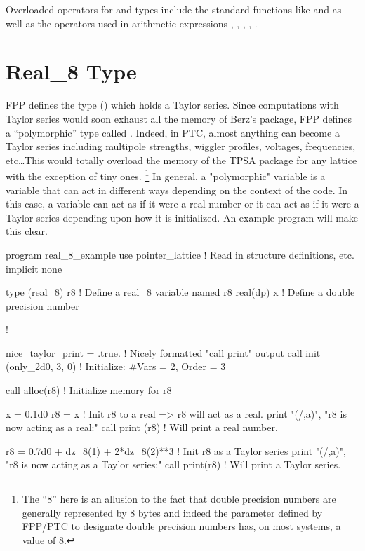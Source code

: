 \documentclass{hitec}     %
\newcommand{\Section}[1]{\section{#1}\vspace*{-1ex}}
\begin{document}
{{{{Overloaded operators for  and  types include the standard functions
like  and  as well as the operators used in arithmetic expressions \vn{+}, \vn{-},
\vn{*}, \vn{/}, \vn{**}.

\newpage

\Section{Real_8 Type}
\label{s:real.8}

FPP defines the  type () which holds a Taylor series. Since computations
with Taylor {\color{h} series would soon exhaust all the memory of Berz's package, FPP defines a ``polymorphic'' type called . Indeed, in PTC, almost anything can become a Taylor series including multipole strengths, wiggler profiles, voltages, frequencies, etc\ldots This would totally overload the memory of the TPSA package for any lattice with the exception of tiny ones.} \footnote
  {
The ``8'' here is an allusion to the fact that double precision numbers are generally represented
by 8 bytes and indeed the  parameter defined by FPP/PTC to designate double precision numbers
has, on most systems, a value of 8.
  }
In general, a "polymorphic" variable is a variable that can act in different ways depending on the
context of the code. In this case, a  variable can act as if it were a real number or it
can act as if it were a Taylor series depending upon how it is initialized. 
An example program will make this clear.
\begin{code}
program real_8_example
use pointer_lattice   ! Read in structure definitions, etc.
implicit none

type (real_8) r8      ! Define a real_8 variable named r8
real(dp) x            ! Define a double precision number

!

nice_taylor_print = .true.    ! Nicely formatted "call print" output
call init (only_2d0, 3, 0)    ! Initialize: #Vars = 2, Order = 3

call alloc(r8)          ! Initialize memory for r8

x = 0.1d0
r8 = x                  ! Init r8 to a real => r8 will act as a real.
print "(/,a)", "r8 is now acting as a real:"
call print (r8)         ! Will print a real number.

r8 = 0.7d0 + dz_8(1) + 2*dz_8(2)**3   ! Init r8 as a Taylor series
print "(/,a)", "r8 is now acting as a Taylor series:"
call print(r8)                        ! Will print a Taylor series.


\end{code}}}}}
\end{document}
